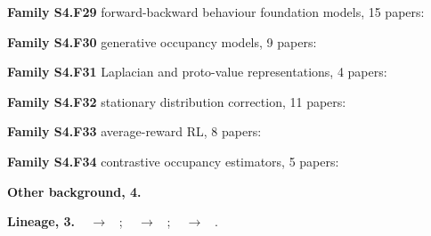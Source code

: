 \documentclass[10pt]{article}
\newcommand{\memb}[1]{\par\smallskip\textbf{#1}\quad}
\begin{document}
\memb{Family S4.F29} forward-backward behaviour foundation models, 15 papers: {\footnotesize \citetext{\citealp{Touati-learning21}; \citealp{Touati-does23}; \citealp{Pirotta-fast24}; \citealp{Bagatella-soft26}; \citealp{Jeen-zeroshot24}; \citealp{Agarwal-proto24}; \citealp{Cetin-finer24}; \citealp{Frans-unsupervised24}; \citealp{Park-foundation24}; \citealp{Rupf-zeroshot24}; \citealp{Bagatella-tdjepa25}; \citealp{Sikchi-fast25}; \citealp{Tirinzoni-zeroshot25}; \citealp{Urpi-epistemically25}; \citealp{Zheng-really26}}}

\memb{Family S4.F30} generative occupancy models, 9 papers: {\footnotesize \citetext{\citealp{Janner-generative20}; \citealp{Blier-learning21}; \citealp{Wiltzer-distributional24}; \citealp{Farebrother-temporal25}; \citealp{Thakoor-generalised22}; \citealp{Mazoure-value23}; \citealp{Ding-diffusion24}; \citealp{Tomar-video24}; \citealp{Zheng-intentionconditioned25}}}

\memb{Family S4.F31} Laplacian and proto-value representations, 4 papers: {\footnotesize \citetext{\citealp{Mahadevan-protovalue07}; \citealp{Wu-laplacian19}; \citealp{Ren-spectral22}; \citealp{Farebrother-protovalue23}}}

\memb{Family S4.F32} stationary distribution correction, 11 papers: {\footnotesize \citetext{\citealp{Nachum-dualdice19}; \citealp{Nachum-reinforcement20}; \citealp{Lee-optidice21}; \citealp{Hallak-consistent17}; \citealp{Liu-breaking18}; \citealp{Gelada-offpolicy19}; \citealp{Nachum-algaedice19}; \citealp{Uehara-minimax20}; \citealp{Zhang-gendice20}; \citealp{Zhang-gradientdice20}; \citealp{Fujimoto-deep21}}}

\memb{Family S4.F33} average-reward RL, 8 papers: {\footnotesize \citetext{\citealp{Zhang-onpolicy21}; \citealp{Schwartz-reinforcement93}; \citealp{Mahadevan-average96}; \citealp{Wan-learning21}; \citealp{Ma-averagereward21}; \citealp{Zhang-averagereward21}; \citealp{Hisaki-rvisac24}; \citealp{Adamczyk-averagereward25}}}

\memb{Family S4.F34} contrastive occupancy estimators, 5 papers: {\footnotesize \citetext{\citealp{Eysenbach-contrastive22}; \citealp{Eysenbach-clearning21}; \citealp{Mazoure-contrastive22}; \citealp{Zheng-contrastive23}; \citealp{Myers-learning24}}}

\memb{Other background, 4.} {\footnotesize \citetext{\citealp{NguimatsiaTiofack-survival26}; \citealp{NguimatsiaTiofack-svl26}; \citealp{Natarajan-dynamic05}; \citealp{Schaul-universal15}}}

\memb{Lineage, 3.} {\footnotesize \citeauthor{Barreto-successor17}~\citeyear{Barreto-successor17} $\to$ \citeauthor{Alegre-optimistic22}~\citeyear{Alegre-optimistic22}; \citeauthor{Janner-generative20}~\citeyear{Janner-generative20} $\to$ \citeauthor{Wiltzer-distributional24}~\citeyear{Wiltzer-distributional24}; \citeauthor{Nachum-reinforcement20}~\citeyear{Nachum-reinforcement20} $\to$ \citeauthor{Lee-semdice25}~\citeyear{Lee-semdice25}.}
\end{document}
